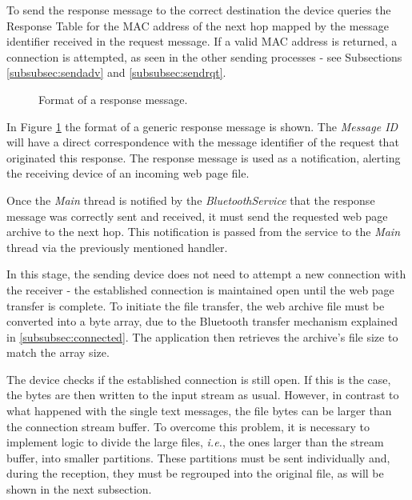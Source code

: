 To send the response message to the correct destination the device queries the Response Table for the \gls{MAC} address of the next hop mapped by the message identifier received in the request message. If a valid \gls{MAC} address is returned, a connection is attempted, as seen in the other sending processes - see Subsections \ref{subsubsec:sendadv} and \ref{subsubsec:sendrqt}.

\begin{figure}[ht]
   \noindent{}
	\caption{\label{fig:rspmsg} Format of a response message.}
\end{figure}

In Figure \ref{fig:rspmsg} the format of a generic response message is shown. The \textit{Message ID} will have a direct correspondence with the message identifier of the request that originated this response. The response message is used as a notification, alerting the receiving device of an incoming web page file.

Once the \textit{Main} thread is notified by the \textit{BluetoothService} that the response message was correctly sent and received, it must send the requested web page archive to the next hop. This notification is passed from the service to the \textit{Main} thread via the previously mentioned handler.

In this stage, the sending device does not need to attempt a new connection with the receiver - the established connection is maintained open until the web page transfer is complete. To initiate the file transfer, the web archive file must be converted into a byte array, due to the Bluetooth transfer mechanism explained in \ref{subsubsec:connected}. The application then retrieves the archive's file size to match the array size.

The device checks if the established connection is still open. If this is the case, the bytes are then written to the input stream as usual. However, in contrast to what happened with the single text messages, the file bytes can be larger than the connection stream buffer. To overcome this problem, it is necessary to implement logic to divide the large files, \textit{i.e.}, the ones larger than the stream buffer, into smaller partitions. These partitions must be sent individually and, during the reception, they must be regrouped into the original file, as will be shown in the next subsection.

